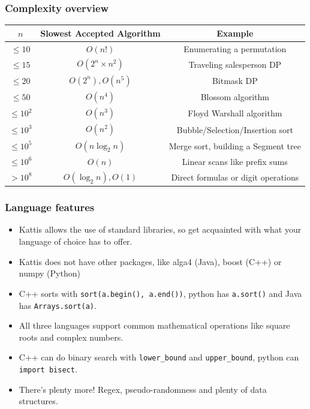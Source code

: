 \documentclass{beamer}
\begin{document}
\begin{frame}[plain]
    \frametitle{Complexity overview}
    \scriptsize
    \begin{center}
        \begin{tabular}{c|c|c}
            $n$ & Slowest Accepted Algorithm & Example \\
            \hline
            $\leq 10$ & $O(n!)$ & Enumerating a permutation \\
            $\leq 15$ & $O(2^n\times n^2)$ & Traveling salesperson DP \\
            $\leq 20$ & $O(2^n), O(n^5)$ & Bitmask DP \\
            $\leq 50$ & $O(n^4)$ & Blossom algorithm \\
            $\leq 10^2$ & $O(n^3)$ & Floyd Warshall algorithm \\
            $\leq 10^3$ & $O(n^2)$ & Bubble/Selection/Insertion sort \\
            $\leq 10^5$ & $O(n\log_2{n})$ & Merge sort, building a Segment tree \\
            $\leq 10^6$ & $O(n)$ & Linear scans like prefix sums \\
            $> 10^8$ & $O(\log_2{n}), O(1)$ & Direct formulas or digit operations \\
        \end{tabular}
    \end{center}
\end{frame}

\begin{frame}[plain]
    \frametitle{Language features}
    \begin{itemize}
        \item Kattis allows the use of standard libraries, so get acquainted with what your language of choice has to offer.
        \item Kattis does not have other packages, like alga4 (Java), boost (C++) or numpy (Python)
        \item C++ sorts with \texttt{sort(a.begin(), a.end())}, python has \texttt{a.sort()} and Java has \texttt{Arrays.sort(a)}.
        \item All three languages support common mathematical operations like square roots and complex numbers.
        \item C++ can do binary search with \texttt{lower\_bound} and \texttt{upper\_bound}, python can \texttt{import bisect}.
        \item There's plenty more! Regex, pseudo-randomness and plenty of data structures.
    \end{itemize}
\end{frame}
\end{document}
